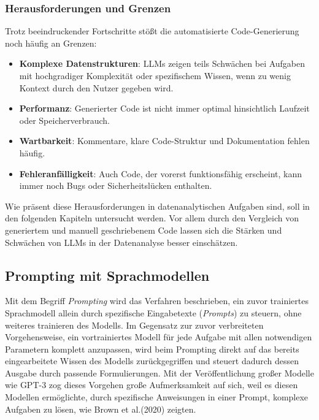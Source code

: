 \documentclass[11pt,a4paper]{article}
\begin{document}
\subsubsection{Herausforderungen und Grenzen}
Trotz beeindruckender Fortschritte stößt die automatisierte Code-Generierung noch häufig an Grenzen:
\begin{itemize}
    \item \textbf{Komplexe Datenstrukturen}: LLMs zeigen teils Schwächen bei Aufgaben mit hochgradiger Komplexität oder spezifischem Wissen, wenn zu wenig Kontext durch den Nutzer gegeben wird\cite{dou2024whatswrongcodegenerated}.
    \item \textbf{Performanz}: Generierter Code ist nicht immer optimal hinsichtlich Laufzeit oder Speicherverbrauch\cite{huang2024effibenchbenchmarkingefficiencyautomatically}.
    \item \textbf{Wartbarkeit}: Kommentare, klare Code-Struktur und Dokumentation fehlen häufig\cite{dou2024whatswrongcodegenerated}.
    \item \textbf{Fehleranfälligkeit}: Auch Code, der vorerst funktionsfähig erscheint, kann immer noch Bugs oder Sicherheitslücken enthalten\cite{chen2021evaluatinglargelanguagemodels,dou2024whatswrongcodegenerated}.
\end{itemize}
Wie präsent diese Herausforderungen in datenanalytischen Aufgaben sind, soll in den folgenden Kapiteln untersucht werden. Vor allem durch den Vergleich von generiertem und manuell geschriebenem Code lassen sich die Stärken und Schwächen von LLMs in der Datenanalyse besser einschätzen.

\subsection{Prompting mit Sprachmodellen}
\label{sec:prompting}
Mit dem Begriff \emph{Prompting} wird das Verfahren beschrieben, ein zuvor trainiertes Sprachmodell allein durch spezifische Eingabetexte (\emph{Prompts}) zu steuern, ohne weiteres trainieren des Modells. Im Gegensatz zur zuvor verbreiteten Vorgehensweise, ein vortrainiertes Modell für jede Aufgabe mit allen notwendigen Parametern komplett anzupassen, wird beim Prompting direkt auf das bereits eingearbeitete Wissen des Modells zurückgegriffen und steuert dadurch dessen Ausgabe durch passende Formulierungen\cite{liu2021pretrainpromptpredictsystematic}. Mit der Veröffentlichung großer Modelle wie GPT-3 zog dieses Vorgehen große Aufmerksamkeit auf sich, weil es diesen Modellen ermöglichte, durch spezifische Anweisungen in einer Prompt, komplexe Aufgaben zu lösen, wie Brown et al.(2020)\cite{brown2020languagemodelsfewshotlearners} zeigten.
\end{document}
